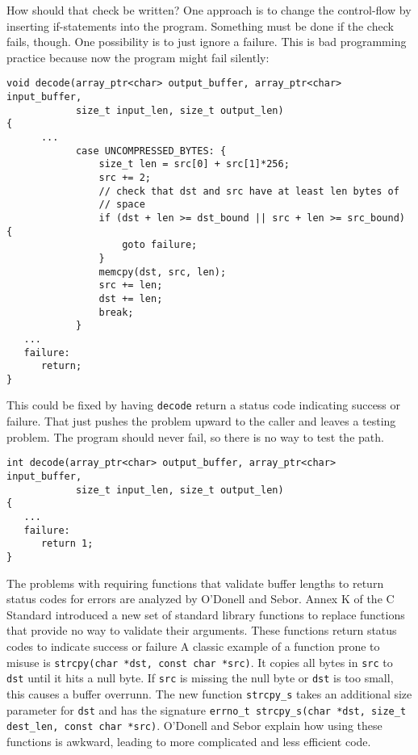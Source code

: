 How should that check be written? One approach is to change the
control-flow by inserting if-statements into the program. Something must
be done if the check fails, though. One possibility is to just ignore a
failure. This is bad programming practice because now the program might
fail silently:

\begin{verbatim}
void decode(array_ptr<char> output_buffer, array_ptr<char> input_buffer, 
            size_t input_len, size_t output_len)
{
      ...
            case UNCOMPRESSED_BYTES: { 
                size_t len = src[0] + src[1]*256;
                src += 2;
                // check that dst and src have at least len bytes of
                // space
                if (dst + len >= dst_bound || src + len >= src_bound) {
                    goto failure;
                }
                memcpy(dst, src, len);
                src += len;
                dst += len;                
                break;
            }
   ...
   failure: 
      return;
}
\end{verbatim}

This could be fixed by having \texttt{decode} return a status code
indicating success or failure. That just pushes the problem upward to
the caller and leaves a testing problem. The program should never fail,
so there is no way to test the path.

\begin{verbatim}
int decode(array_ptr<char> output_buffer, array_ptr<char> input_buffer, 
            size_t input_len, size_t output_len)
{
   ...
   failure: 
      return 1;
}
\end{verbatim}

The problems with requiring functions that validate buffer lengths to
return status codes for errors are analyzed by O'Donell and Sebor\cite{ODonell2015}. 
Annex K of the C Standard \cite{ISO2011} introduced a new set of standard library functions to replace
functions that provide no way to validate their arguments. These
functions return status codes to indicate success or failure A classic
example of a function prone to misuse is \texttt{strcpy(char *dst, const
char *src)}. It copies all bytes in \texttt{src} to \texttt{dst} until
it hits a null byte. If \texttt{src} is missing the null byte or
\texttt{dst} is too small, this causes a buffer overrunn. The new
function \texttt{strcpy\_s} takes an additional size parameter for
\texttt{dst} and has the signature \texttt{errno\_t strcpy\_s(char *dst,
size\_t dest\_len, const char *src)}. O'Donell and Sebor explain how
using these functions is awkward, leading to more complicated and less
efficient code.

